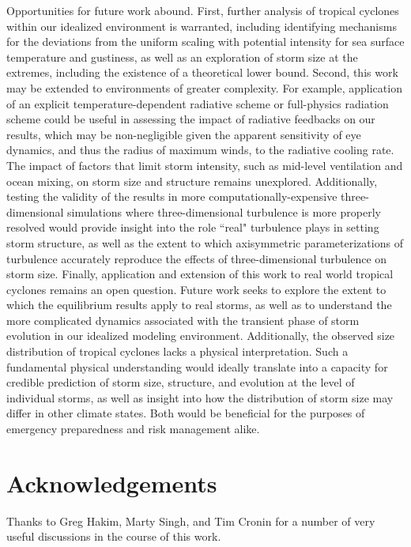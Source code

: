 \documentclass[12pt]{article}
\begin{document}
Opportunities for future work abound. First, further analysis of tropical cyclones within our idealized environment is warranted, including identifying mechanisms for the deviations from the uniform scaling with potential intensity for sea surface temperature and gustiness, as well as an exploration of storm size at the extremes, including the existence of a theoretical lower bound. Second, this work may be extended to environments of greater complexity.  For example, application of an explicit temperature-dependent radiative scheme or full-physics radiation scheme could be useful in assessing the impact of radiative feedbacks on our results, which may be non-negligible given the apparent sensitivity of eye dynamics, and thus the radius of maximum winds, to the radiative cooling rate. The impact of factors that limit storm intensity, such as mid-level ventilation \citep{Tang_Emanuel_2010} and ocean mixing, on storm size and structure remains unexplored. Additionally, testing the validity of the results in more computationally-expensive three-dimensional simulations where three-dimensional turbulence is more properly resolved would provide insight into the role ``real" turbulence plays in setting storm structure, as well as the extent to which axisymmetric parameterizations of turbulence accurately reproduce the effects of three-dimensional turbulence on storm size.  Finally, application and extension of this work to real world tropical cyclones remains an open question. Future work seeks to explore the extent to which the equilibrium results apply to real storms, as well as to understand the more complicated dynamics associated with the transient phase of storm evolution in our idealized modeling environment. Additionally, the observed size distribution of tropical cyclones \citep{Chavas_Emanuel_2010} lacks a physical interpretation. Such a fundamental physical understanding would ideally translate into a capacity for credible prediction of storm size, structure, and evolution at the level of individual storms, as well as insight into how the distribution of storm size may differ in other climate states. Both would be beneficial for the purposes of emergency preparedness and risk management alike.


\section{Acknowledgements}
Thanks to Greg Hakim, Marty Singh, and Tim Cronin for a number of very useful discussions in the course of this work.
\end{document}
